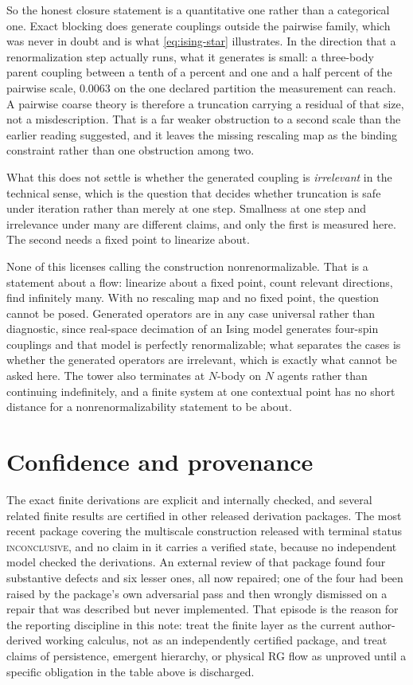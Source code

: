 \documentclass[11pt,letterpaper]{article}
\begin{document}
So the honest closure statement is a quantitative one rather than a categorical
one. Exact blocking does generate couplings outside the pairwise family, which was
never in doubt and is what \eqref{eq:ising-star} illustrates. In the direction that
a renormalization step actually runs, what it generates is small: a three-body
parent coupling between a tenth of a percent and one and a half percent of the
pairwise scale, $0.0063$ on the one declared partition the measurement can reach. A pairwise coarse theory is therefore a truncation carrying a residual of
that size, not a misdescription. That is a far weaker obstruction to a second scale
than the earlier reading suggested, and it leaves the missing rescaling map as the
binding constraint rather than one obstruction among two.

What this does not settle is whether the generated coupling is \emph{irrelevant} in
the technical sense, which is the question that decides whether truncation is safe
under iteration rather than merely at one step. Smallness at one step and
irrelevance under many are different claims, and only the first is measured here.
The second needs a fixed point to linearize about.

None of this licenses calling the construction nonrenormalizable. That is a
statement about a flow: linearize about a fixed point, count relevant directions,
find infinitely many. With no rescaling map and no fixed point, the question
cannot be posed. Generated operators are in any case universal rather than
diagnostic, since real-space decimation of an Ising model generates four-spin
couplings and that model is perfectly renormalizable; what separates the cases is
whether the generated operators are irrelevant, which is exactly what cannot be
asked here. The tower also terminates at $N$-body on $N$ agents rather than
continuing indefinitely, and a finite system at one contextual point has no short
distance for a nonrenormalizability statement to be about.

\section{Confidence and provenance}

The exact finite derivations are explicit and internally checked, and several related
finite results are certified in other released derivation packages. The most recent
package covering the multiscale construction released with terminal status
\textsc{inconclusive}, and no claim in it carries a verified state, because no
independent model checked the derivations. An external review of that package found
four substantive defects and six lesser ones, all now repaired; one of the four had
been raised by the package's own adversarial pass and then wrongly dismissed on a
repair that was described but never implemented. That episode is the reason for the
reporting discipline in this note: treat the finite layer as the current author-derived
working calculus, not as an independently certified package, and treat claims of
persistence, emergent hierarchy, or physical RG flow as unproved until a specific
obligation in the table above is discharged.
\end{document}
